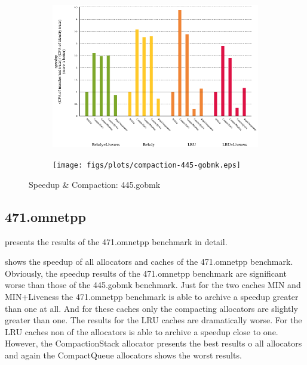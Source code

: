 \documentclass[onecolumn, openright, master, english, signatures]{dbrgrptt}
\begin{document}
\begin{figure}[!ht]
  \centering
  \begin{subfigure}[b]{0.5\textwidth}%
    \includegraphics[width=\textwidth]{figs/plots/speedup-445-gobmk.eps}
  \label{fig:speedup-compaction-445-gobmk-speedup}
  \end{subfigure}%
    \begin{subfigure}[b]{0.5\textwidth}%
    \texttt{[image: figs/plots/compaction-445-gobmk.eps]}
  \label{fig:speedup-compaction-445-gobmk-compaction}
  \end{subfigure}%
  \caption{Speedup \& Compaction: 445.gobmk}
  \label{fig:speedup-compaction-445-gobmk}
\end{figure}

\subsection{471.omnetpp}

 presents the results of the 471.omnetpp benchmark in detail.

 shows the speedup of all allocators and caches of the 471.omnetpp benchmark. Obviously, the speedup results of the 471.omnetpp benchmark are significant worse than those of the 445.gobmk benchmark. Just for the two caches \ac{MIN} and \ac{MIN}+Liveness the 471.omnetpp benchmark is able to archive a speedup greater than one at all. And for these caches only the compacting allocators are slightly greater than one. The results for the \ac{LRU} caches are dramatically worse. For the \ac{LRU} caches non of the allocators is able to archive a speedup close to one. However, the CompactionStack allocator presents the best results o all allocators and again the CompactQueue allocators shows the worst results.
\end{document}
